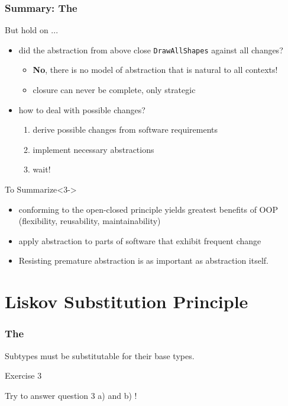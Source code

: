 \documentclass[9pt]{beamer}
\begin{document}
\begin{frame}
  \frametitle{Summary: The \secname}
\begin{block}{But hold on ...}
  \begin{itemize}
  \item<1-> did the abstraction from above close \texttt{DrawAllShapes} against all changes?
    \begin{itemize}
    \item \textbf{No}, there is no model of abstraction that is natural to all
      contexts!
    \item closure can never be complete, only strategic
    \end{itemize}
  \item<2-> how to deal with possible changes?
    \begin{enumerate}
    \item derive possible changes from software requirements
    \item implement necessary abstractions
    \item wait!
    \end{enumerate}
  \end{itemize}
\end{block}
\vfill
\pause
\begin{block}{To Summarize}<3->
  \begin{itemize}
  \item conforming to the open-closed principle yields greatest benefits of OOP (flexibility, reusability, maintainability)
  \item apply abstraction to parts of software that exhibit frequent change
  \item \alert<3->{Resisting premature abstraction is as important as abstraction itself.}
  \end{itemize}
\end{block}
\end{frame}

\section{Liskov Substitution Principle}
\begin{frame}
  \frametitle{The \secname}
  \begin{theorem}
    Subtypes must be substitutable for their base types.
  \end{theorem}
\pause
\vfill
\begin{exampleblock}{Exercise 3}
  \begin{center}
    Try to answer question 3 a) and b) !
  \end{center}
\end{exampleblock}
\end{frame}
\end{document}

